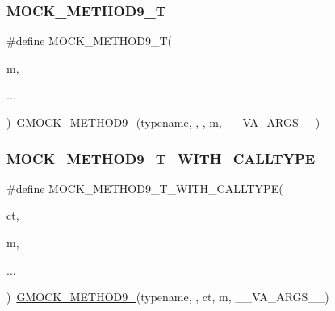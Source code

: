 \mbox{\label{_obj__test_2lib_2googletest-master_2googlemock_2include_2gmock_2gmock-generated-function-mockers_8h_a838c68cbdf422cfc703b83daf1d1f1e1}} 
\subsubsection{\texorpdfstring{MOCK\_METHOD9\_T}{MOCK\_METHOD9\_T}}
{\footnotesize\ttfamily \#define M\+O\+C\+K\+\_\+\+M\+E\+T\+H\+O\+D9\+\_\+T(\begin{DoxyParamCaption}\item[{}]{m,  }\item[{}]{... }\end{DoxyParamCaption})~\mbox{\hyperlink{_obj__test_2lib_2googletest-release-1_88_81_2googlemock_2include_2gmock_2gmock-generated-function-mockers_8h_aa820171a19cc587c247dbe05cbffc55f}{G\+M\+O\+C\+K\+\_\+\+M\+E\+T\+H\+O\+D9\+\_\+}}(typename, , , m, \+\_\+\+\_\+\+V\+A\+\_\+\+A\+R\+G\+S\+\_\+\+\_\+)}

\mbox{\label{_obj__test_2lib_2googletest-master_2googlemock_2include_2gmock_2gmock-generated-function-mockers_8h_ad1bd879e10bad098cf68c27c75f4be09}} 
\subsubsection{\texorpdfstring{MOCK\_METHOD9\_T\_WITH\_CALLTYPE}{MOCK\_METHOD9\_T\_WITH\_CALLTYPE}}
{\footnotesize\ttfamily \#define M\+O\+C\+K\+\_\+\+M\+E\+T\+H\+O\+D9\+\_\+\+T\+\_\+\+W\+I\+T\+H\+\_\+\+C\+A\+L\+L\+T\+Y\+PE(\begin{DoxyParamCaption}\item[{}]{ct,  }\item[{}]{m,  }\item[{}]{... }\end{DoxyParamCaption})~\mbox{\hyperlink{_obj__test_2lib_2googletest-release-1_88_81_2googlemock_2include_2gmock_2gmock-generated-function-mockers_8h_aa820171a19cc587c247dbe05cbffc55f}{G\+M\+O\+C\+K\+\_\+\+M\+E\+T\+H\+O\+D9\+\_\+}}(typename, , ct, m, \+\_\+\+\_\+\+V\+A\+\_\+\+A\+R\+G\+S\+\_\+\+\_\+)}

